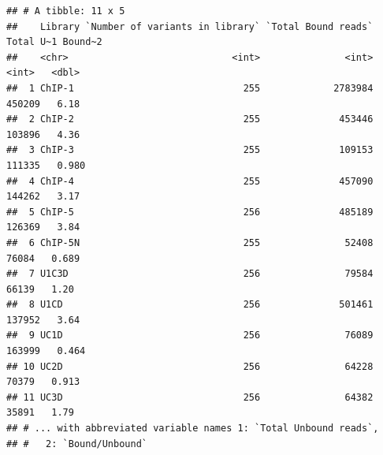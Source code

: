\documentclass[
]{article}
\begin{document}
\begin{verbatim}
## # A tibble: 11 x 5
##    Library `Number of variants in library` `Total Bound reads` Total U~1 Bound~2
##    <chr>                             <int>               <int>     <int>   <dbl>
##  1 ChIP-1                              255             2783984    450209   6.18 
##  2 ChIP-2                              255              453446    103896   4.36 
##  3 ChIP-3                              255              109153    111335   0.980
##  4 ChIP-4                              255              457090    144262   3.17 
##  5 ChIP-5                              256              485189    126369   3.84 
##  6 ChIP-5N                             255               52408     76084   0.689
##  7 U1C3D                               256               79584     66139   1.20 
##  8 U1CD                                256              501461    137952   3.64 
##  9 UC1D                                256               76089    163999   0.464
## 10 UC2D                                256               64228     70379   0.913
## 11 UC3D                                256               64382     35891   1.79 
## # ... with abbreviated variable names 1: `Total Unbound reads`,
## #   2: `Bound/Unbound`
\end{verbatim}
\end{document}
